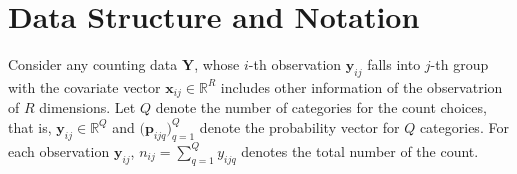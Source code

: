 \documentclass[]{report}
\theoremstyle{definition}
\begin{document}
    \section{Data Structure and Notation}
    \label{sec:data}

	\label{sec:decomp}
Consider any counting data $\bm{Y}$, whose $i$-th observation $\bm{y}_{ij}$ falls into $j$-th group with the covariate vector $\bm{x}_{ij}\in \mathbb{R}^{R}$ includes other information of the observatrion of $R$ dimensions. Let $Q$ denote the number of categories for the count choices, that is, $\bm{y}_{ij}\in \mathbb{R}^{Q}$ and  $\bigl(\bm{p}_{ijq}\bigr)_{q=1}^{Q}$ denote the probability vector for $Q$ categories.  For each observation $\bm{y}_{ij}$, $n_{ij}=\sum_{q=1}^{ Q} y_{ijq}$ denotes the total number of the count.
\end{document}
